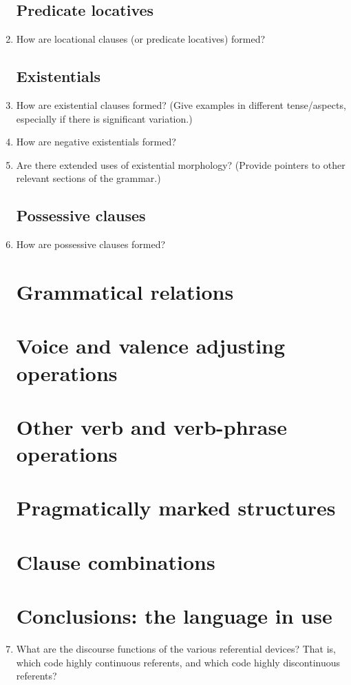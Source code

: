 \documentclass[twocolumn]{scrartcl}
\begin{document}
\begin{enumerate}[resume]
\subsection{Predicate locatives}
\item How are locational clauses (or predicate locatives) formed?
\subsection{Existentials}
\item How are existential clauses formed? (Give examples in different tense/aspects, especially if there is significant variation.)
\item How are negative existentials formed?
\item Are there extended uses of existential morphology? (Provide pointers to other relevant sections of the grammar.)
\subsection{Possessive clauses}
\item How are possessive clauses formed?
\section{Grammatical relations}
\section{Voice and valence adjusting operations}
\section{Other verb and verb-phrase operations}
\section{Pragmatically marked structures}
\section{Clause combinations}
\section{Conclusions: the language in use}
\item What are the discourse functions of the various referential devices? That is, which code highly continuous referents, and which code highly discontinuous referents?
\end{enumerate}
\end{document}
